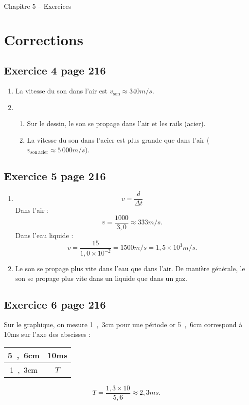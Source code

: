 \documentclass[12pt,a4paper,fleqn]{article}
\begin{document}
\begin{header}
Chapitre 5 -- Exercices
\end{header}

\section*{Corrections}

\subsection*{Exercice 4 page 216}

\begin{enumerate}
\item La vitesse du son dans l'air est $v_\mathrm{son} \approx \unit{340}{m/s}$.

\item
\begin{enumerate}
\item Sur le dessin, le son se propage dans l'air et les rails (acier).
\item La vitesse du son dans l'acier est plus grande que dans l'air ($v_\mathrm{son\ acier} \approx \unit{5\,000}{m/s}$).
\end{enumerate}
\end{enumerate}

\subsection*{Exercice 5 page 216}

\begin{enumerate}
\item
\[
v = \frac{d}{\Delta t}
\]
Dans l'air :
\[
v = \frac{1000}{3{,}0} \approx \unit{333}{m/s}.
\]
Dans l'eau liquide :
\[
v = \frac{15}{1{,}0\times 10^{-2}} = \unit{1500}{m/s} = \unit{1{,}5\times 10^{3}}{m/s}.
\]

\item Le son se propage plus vite dans l'eau que dans l'air.
De manière générale, le son se propage plus vite dans un liquide que dans un gaz.
\end{enumerate}

\subsection*{Exercice 6 page 216}

Sur le graphique, on mesure \unit{1{,}3}{cm} pour une période or \unit{5{,}6}{cm} correspond à \unit{10}{ms} sur l'axe des abscisses :
\begin{center}
\begin{tabular}{c|c}
\unit{5{,}6}{cm} & \unit{10}{ms} \\
\hline
\unit{1{,}3}{cm} & $T$ 
\end{tabular}
\end{center}
\[
T = \frac{1{,}3 \times 10}{5{,}6} \approx \unit{2{,}3}{ms}.
\]
\end{document}
